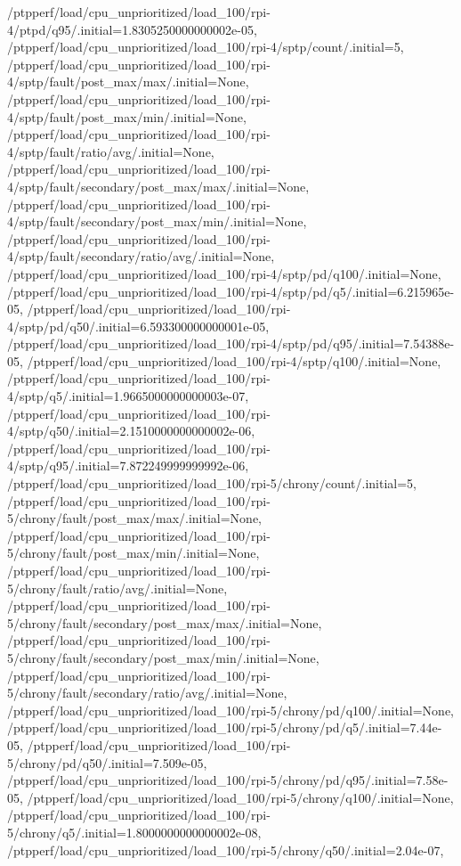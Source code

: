 {    /ptpperf/load/cpu_unprioritized/load_100/rpi-4/ptpd/q95/.initial=1.8305250000000002e-05,
    /ptpperf/load/cpu_unprioritized/load_100/rpi-4/sptp/count/.initial=5,
    /ptpperf/load/cpu_unprioritized/load_100/rpi-4/sptp/fault/post_max/max/.initial=None,
    /ptpperf/load/cpu_unprioritized/load_100/rpi-4/sptp/fault/post_max/min/.initial=None,
    /ptpperf/load/cpu_unprioritized/load_100/rpi-4/sptp/fault/ratio/avg/.initial=None,
    /ptpperf/load/cpu_unprioritized/load_100/rpi-4/sptp/fault/secondary/post_max/max/.initial=None,
    /ptpperf/load/cpu_unprioritized/load_100/rpi-4/sptp/fault/secondary/post_max/min/.initial=None,
    /ptpperf/load/cpu_unprioritized/load_100/rpi-4/sptp/fault/secondary/ratio/avg/.initial=None,
    /ptpperf/load/cpu_unprioritized/load_100/rpi-4/sptp/pd/q100/.initial=None,
    /ptpperf/load/cpu_unprioritized/load_100/rpi-4/sptp/pd/q5/.initial=6.215965e-05,
    /ptpperf/load/cpu_unprioritized/load_100/rpi-4/sptp/pd/q50/.initial=6.593300000000001e-05,
    /ptpperf/load/cpu_unprioritized/load_100/rpi-4/sptp/pd/q95/.initial=7.54388e-05,
    /ptpperf/load/cpu_unprioritized/load_100/rpi-4/sptp/q100/.initial=None,
    /ptpperf/load/cpu_unprioritized/load_100/rpi-4/sptp/q5/.initial=1.9665000000000003e-07,
    /ptpperf/load/cpu_unprioritized/load_100/rpi-4/sptp/q50/.initial=2.1510000000000002e-06,
    /ptpperf/load/cpu_unprioritized/load_100/rpi-4/sptp/q95/.initial=7.872249999999992e-06,
    /ptpperf/load/cpu_unprioritized/load_100/rpi-5/chrony/count/.initial=5,
    /ptpperf/load/cpu_unprioritized/load_100/rpi-5/chrony/fault/post_max/max/.initial=None,
    /ptpperf/load/cpu_unprioritized/load_100/rpi-5/chrony/fault/post_max/min/.initial=None,
    /ptpperf/load/cpu_unprioritized/load_100/rpi-5/chrony/fault/ratio/avg/.initial=None,
    /ptpperf/load/cpu_unprioritized/load_100/rpi-5/chrony/fault/secondary/post_max/max/.initial=None,
    /ptpperf/load/cpu_unprioritized/load_100/rpi-5/chrony/fault/secondary/post_max/min/.initial=None,
    /ptpperf/load/cpu_unprioritized/load_100/rpi-5/chrony/fault/secondary/ratio/avg/.initial=None,
    /ptpperf/load/cpu_unprioritized/load_100/rpi-5/chrony/pd/q100/.initial=None,
    /ptpperf/load/cpu_unprioritized/load_100/rpi-5/chrony/pd/q5/.initial=7.44e-05,
    /ptpperf/load/cpu_unprioritized/load_100/rpi-5/chrony/pd/q50/.initial=7.509e-05,
    /ptpperf/load/cpu_unprioritized/load_100/rpi-5/chrony/pd/q95/.initial=7.58e-05,
    /ptpperf/load/cpu_unprioritized/load_100/rpi-5/chrony/q100/.initial=None,
    /ptpperf/load/cpu_unprioritized/load_100/rpi-5/chrony/q5/.initial=1.8000000000000002e-08,
    /ptpperf/load/cpu_unprioritized/load_100/rpi-5/chrony/q50/.initial=2.04e-07,
}
